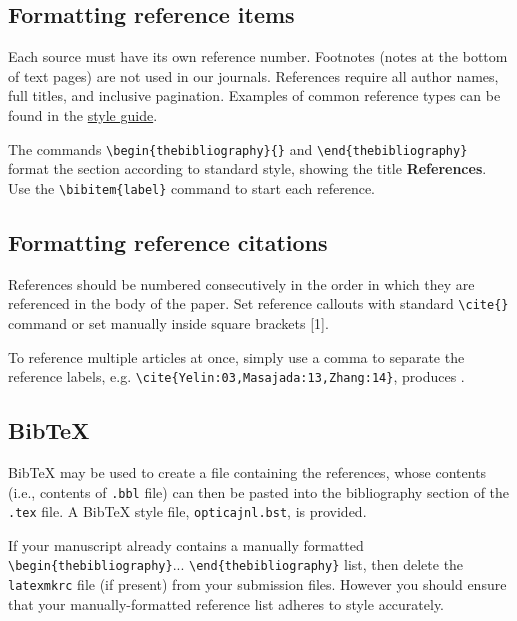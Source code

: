 \documentclass{optica-article}
\begin{document}
\subsection{Formatting reference items}
Each source must have its own reference number. Footnotes (notes at the bottom of text pages) are not used in our journals. References require all author names, full titles, and inclusive pagination. Examples of common reference types can be found in the  \href{https://opg.optica.org/jot/submit/style/oestyleguide.cfm} {style guide}.


The commands \verb+\begin{thebibliography}{}+ and \verb+\end{thebibliography}+ format the section according to standard style, showing the title {\bfseries References}.  Use the \verb+\bibitem{label}+ command to start each reference.

\subsection{Formatting reference citations}
References should be numbered consecutively in the order in which they are referenced in the body of the paper. Set reference callouts with standard \verb+\cite{}+ command or set manually inside square brackets [1].

To reference multiple articles at once, simply use a comma to separate the reference labels, e.g. \verb+\cite{Yelin:03,Masajada:13,Zhang:14}+, produces \cite{Yelin:03,Masajada:13,Zhang:14}.

\subsection{Bib\TeX}
\label{sec:bibtex}
Bib\TeX{} may be used to create a file containing the references, whose contents (i.e., contents of \texttt{.bbl} file) can then be pasted into the bibliography section of the \texttt{.tex} file. A Bib\TeX{} style file, \texttt{opticajnl.bst}, is provided.

If your manuscript already contains a manually formatted \verb|\begin{thebibliography}|... \verb|\end{thebibliography}| list, then delete the \texttt{latexmkrc} file (if present) from your submission files. However you should ensure that your manually-formatted reference list adheres to style accurately.
\end{document}
